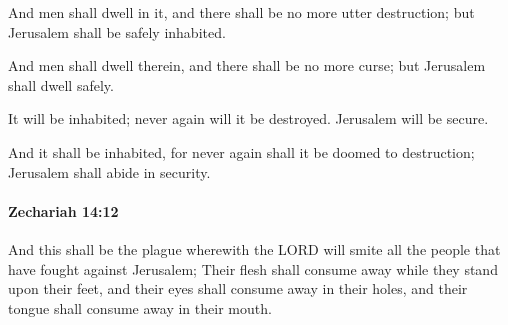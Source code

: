 			And men shall dwell in it, and there shall be no more utter destruction; but Jerusalem shall be safely inhabited.

			\begin{versebox}
					\item[BHS] 
					\item[LXX] 
					\item[ASV] And men shall dwell therein, and there shall be no more curse; but Jerusalem shall dwell safely.
					\item[NIV] It will be inhabited; never again will it be destroyed. Jerusalem will be secure.
					\item[NRSV] And it shall be inhabited, for never again shall it be doomed to destruction; Jerusalem shall abide in security.
			\end{versebox}

		\paragraph{Zechariah 14:12} %
			\label{ZECHARIAH-14-12}

			And this shall be the plague wherewith the LORD will smite all the people that have fought against Jerusalem; Their flesh shall consume away while they stand upon their feet, and their eyes shall consume away in their holes, and their tongue shall consume away in their mouth.

